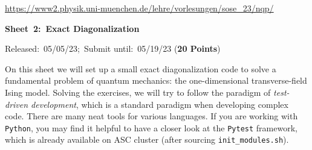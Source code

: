 \documentclass[a4paper, 12pt]{article}
\begin{document}
	   
\vspace*{-13mm}
\noindent{}
\hfill
%
\hfill\hfill
\hfill
\begin{center}
	\small \url{https://www2.physik.uni-muenchen.de/lehre/vorlesungen/sose_23/nqp/}
\end{center}
%
\vspace{8mm}
%
\centerline{\Large\textbf{Sheet~2:~Exact Diagonalization}}
%
\vspace{3mm}
%
\normalsize\centerline{Released:~05/05/23;~Submit until:~05/19/23 (\textbf{20 Points})}
%
%
%
\vspace{6mm}
%
On this sheet we will set up a small exact diagonalization code to solve a fundamental problem of quantum mechanics: the one-dimensional transverse-field Ising model.
%
Solving the exercises, we will try to follow the paradigm of \textit{test-driven development}, which is a standard paradigm when developing complex code.
%
There are many neat tools for various languages.
%
If you are working with \texttt{Python}, you may find it helpful to have a closer look at the \texttt{Pytest} framework, which is already available on ASC cluster (after sourcing \texttt{init\_modules.sh}).
%
\end{document}
